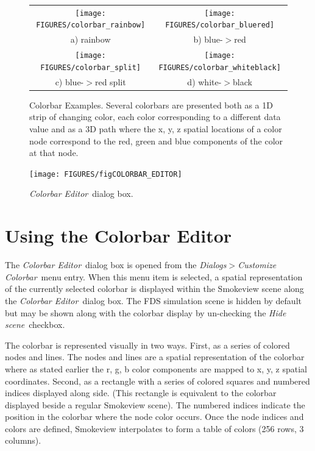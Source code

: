 \documentclass[11pt,twoside]{book}
\begin{document}
\begin{figure}[\figoptions]
\begin{center}
\begin{tabular}{cc}
\texttt{[image: FIGURES/colorbar\_rainbow]}&
\texttt{[image: FIGURES/colorbar\_bluered]}\\
a) rainbow&b) blue-$>$red\\
\texttt{[image: FIGURES/colorbar\_split]}&
\texttt{[image: FIGURES/colorbar\_whiteblack]}\\
c) blue-$>$red split&d) white-$>$black
\end{tabular}
\end{center}
\caption[Colorbar Examples]{
Colorbar Examples.  Several colorbars are presented both as a 1D strip
of changing color, each color corresponding to a different
data value and as a 3D path where the x, y, z spatial locations
of a color node correspond to the red, green and blue components
of the color at that node.} \label{figCOLORBAR_EXAMPLES}
\end{figure}

\begin{figure}[\figoptions]
\begin{center}
\texttt{[image: FIGURES/figCOLORBAR\_EDITOR]}
\end{center}
\caption[{\em Colorbar Editor}\ dialog box.]{ {\em Colorbar
Editor}\ dialog box.} \label{figCOLORBAR}
\end{figure}

\section{Using the Colorbar Editor}
\label{section:colorbar}
The {\em Colorbar Editor}\ dialog box is opened from the {\em
Dialogs$>$Customize Colorbar}\ menu entry. When this menu item is
selected, a spatial representation of the currently selected
colorbar is displayed within the Smokeview scene along the {\em
Colorbar Editor}\ dialog box.  The FDS simulation scene is hidden
by default but may be shown along with the colorbar display by
un-checking the {\em Hide scene}\ checkbox.

The colorbar is represented visually in two ways.  First, as a series
of colored nodes and lines.
The nodes and lines are a spatial representation of the colorbar where as
stated earlier the r, g, b color components are mapped to x, y, z spatial
coordinates.
Second, as a rectangle with a series of colored squares and numbered
indices
displayed along side. (This rectangle is equivalent to the colorbar
displayed beside a regular Smokeview scene).  The numbered indices indicate
the position in the colorbar where the node color occurs.
Once the node indices and colors are defined, Smokeview interpolates to
form a table of colors (256 rows, 3 columns).
\end{document}
